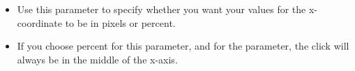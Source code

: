 % 
\begin{itemize}
\item Use this parameter to specify whether you want your values for the x-coordinate to be in pixels or percent.
\item  If you choose percent for  this parameter, and  for the  parameter, the click will always be in the middle of the x-axis.
\end{itemize}